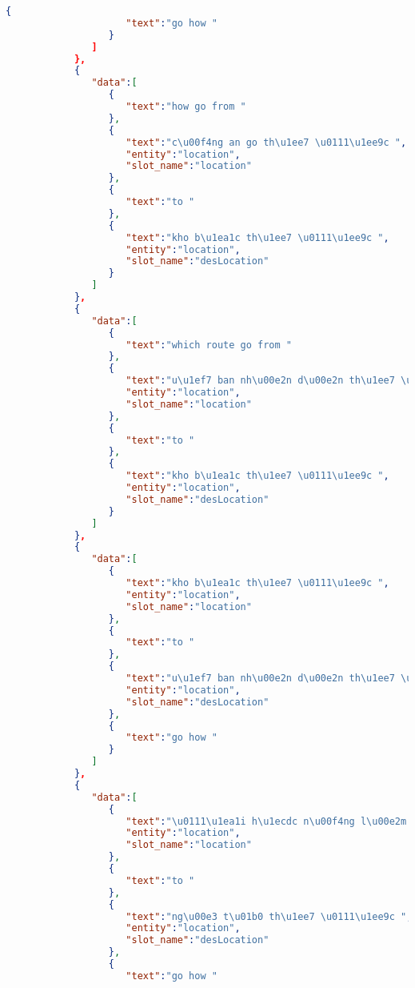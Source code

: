 \begin{lstlisting}[language=json,firstnumber=1]
                  {
                     "text":"go how "
                  }
               ]
            },
            {
               "data":[
                  {
                     "text":"how go from "
                  },
                  {
                     "text":"c\u00f4ng an go th\u1ee7 \u0111\u1ee9c ",
                     "entity":"location",
                     "slot_name":"location"
                  },
                  {
                     "text":"to "
                  },
                  {
                     "text":"kho b\u1ea1c th\u1ee7 \u0111\u1ee9c ",
                     "entity":"location",
                     "slot_name":"desLocation"
                  }
               ]
            },
            {
               "data":[
                  {
                     "text":"which route go from "
                  },
                  {
                     "text":"u\u1ef7 ban nh\u00e2n d\u00e2n th\u1ee7 \u0111\u1ee9c ",
                     "entity":"location",
                     "slot_name":"location"
                  },
                  {
                     "text":"to "
                  },
                  {
                     "text":"kho b\u1ea1c th\u1ee7 \u0111\u1ee9c ",
                     "entity":"location",
                     "slot_name":"desLocation"
                  }
               ]
            },
            {
               "data":[
                  {
                     "text":"kho b\u1ea1c th\u1ee7 \u0111\u1ee9c ",
                     "entity":"location",
                     "slot_name":"location"
                  },
                  {
                     "text":"to "
                  },
                  {
                     "text":"u\u1ef7 ban nh\u00e2n d\u00e2n th\u1ee7 \u0111\u1ee9c ",
                     "entity":"location",
                     "slot_name":"desLocation"
                  },
                  {
                     "text":"go how "
                  }
               ]
            },
            {
               "data":[
                  {
                     "text":"\u0111\u1ea1i h\u1ecdc n\u00f4ng l\u00e2m th\u00e0nh ph\u1ed1 h\u1ed3 ch\u00ed minh ",
                     "entity":"location",
                     "slot_name":"location"
                  },
                  {
                     "text":"to "
                  },
                  {
                     "text":"ng\u00e3 t\u01b0 th\u1ee7 \u0111\u1ee9c ",
                     "entity":"location",
                     "slot_name":"desLocation"
                  },
                  {
                     "text":"go how "

\end{lstlisting}
